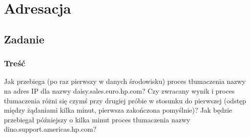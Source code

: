 			

\section{Adresacja}
	\subsection{Zadanie}
		\subsubsection{Treść}
			Jak przebiega (po raz pierwszy w danych środowisku) proces tłumaczenia nazwy na adres IP dla nazwy daisy.sales.euro.hp.com? Czy zwracany wynik i proces tłumaczenia różni się czymś przy drugiej próbie w stosunku do pierwszej (odstęp między żądaniami kilka minut, pierwsza zakończona pomyślnie)? Jak będzie przebiegał późniejszy o kilka minut proces tłumaczenia nazwy dino.support.americas.hp.com?
